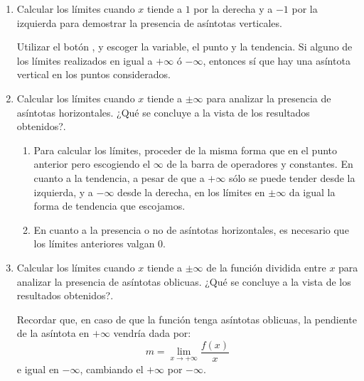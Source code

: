 \begin{enumerate}[leftmargin=*]
\begin{enumerate}
\begin{indicacion}
{}
\end{indicacion}

\item Calcular los límites cuando $x$ tiende a $1$ por la derecha
y a $-1$ por la izquierda para demostrar la presencia de asíntotas
verticales.

\begin{indicacion}
{Utilizar el botón , y escoger la
variable, el punto y la tendencia. Si alguno de los límites
realizados en igual a $+\infty$ ó $-\infty$, entonces sí que hay una
asíntota vertical en los puntos considerados.

}
\end{indicacion}

\item Calcular los límites cuando $x$ tiende a $\pm\infty$ para
analizar la presencia de asíntotas horizontales. ¿Qué se concluye a
la vista de los resultados obtenidos?.

\begin{indicacion}
{
\begin{enumerate}

\item Para calcular los límites, proceder de la misma forma que en
el punto anterior pero escogiendo el $\infty$ de la barra de
operadores y constantes. En cuanto a la tendencia, a pesar de que a
$+\infty$ sólo se puede tender desde la izquierda, y a $-\infty$
desde la derecha, en los límites en $\pm\infty$ da igual la forma de
tendencia que escojamos.

\item En cuanto a la presencia o no de asíntotas horizontales, es
necesario que los límites anteriores valgan 0.

\end{enumerate}

}
\end{indicacion}

\item Calcular los límites cuando $x$ tiende a $\pm\infty$ de la
función dividida entre $x$ para analizar la presencia de asíntotas
oblicuas. ¿Qué se concluye a la vista de los resultados obtenidos?.

\begin{indicacion}
{Recordar que, en caso de que la función tenga asíntotas oblicuas,
la pendiente de la asíntota en $+\infty$ vendría dada por:
\[
m = \mathop {\lim }\limits_{x \to  + \infty } \frac{{f(x)}} {x}
\]
e igual en $-\infty$, cambiando el $+\infty$ por $-\infty$.

}
\end{indicacion}
\end{enumerate}
\end{enumerate}
